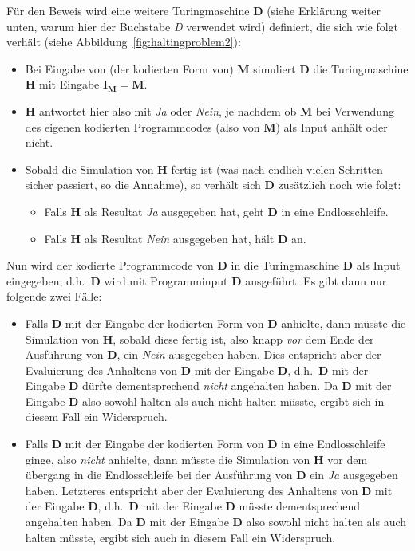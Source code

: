 Für den Beweis wird eine weitere Turingmaschine $\mathbf{D}$ (siehe Erklärung weiter unten, warum hier der Buchstabe \emph{D} verwendet wird) definiert, die sich wie folgt verhält (siehe Abbildung~\ref{fig:haltingproblem2}):
\begin{itemize}
  \item Bei Eingabe von (der kodierten Form von) $\mathbf{M}$ simuliert $\mathbf{D}$  die Turingmaschine $\mathbf{H}$ mit Eingabe $\mathbf{I_M = M}$.
  \item $\mathbf{H}$ antwortet hier also mit \emph{Ja} oder \emph{Nein}, je nachdem ob $\mathbf{M}$ bei Verwendung des eigenen kodierten Programmcodes (also von $\mathbf{M}$) als Input anhält oder nicht.
  \item Sobald die Simulation von $\mathbf{H}$ fertig ist (was nach endlich vielen Schritten sicher passiert, so die Annahme), so verhält sich $\mathbf{D}$ zusätzlich noch wie folgt:
    \begin{itemize}
      \item Falls $\mathbf{H}$ als Resultat \emph{Ja} ausgegeben hat, geht $\mathbf{D}$ in eine Endlosschleife.
      \item Falls $\mathbf{H}$ als Resultat \emph{Nein} ausgegeben hat, hält $\mathbf{D}$  an.
    \end{itemize}
\end{itemize}

\noindent Nun wird der kodierte Programmcode von $\mathbf{D}$ in die Turingmaschine $\mathbf{D}$ als Input eingegeben, d.h.\ $\mathbf{D}$ wird mit Programminput $\mathbf{D}$ ausgeführt. Es gibt dann nur folgende zwei Fälle:

\begin{itemize}
  \item Falls $\mathbf{D}$ mit der Eingabe der kodierten Form von $\mathbf{D}$ anhielte, dann müsste die Simulation von $\mathbf{H}$, sobald diese fertig ist, also knapp \emph{vor} dem Ende der Ausführung von $\mathbf{D}$, ein \emph{Nein} ausgegeben haben. Dies entspricht aber der Evaluierung des Anhaltens von $\mathbf{D}$ mit der Eingabe $\mathbf{D}$, d.h.\ $\mathbf{D}$ mit der Eingabe $\mathbf{D}$ dürfte dementsprechend \emph{nicht} angehalten haben. Da $\mathbf{D}$ mit der Eingabe $\mathbf{D}$ also sowohl halten als auch nicht halten müsste, ergibt sich in diesem Fall ein Widerspruch.
  \item Falls $\mathbf{D}$ mit der Eingabe der kodierten Form von $\mathbf{D}$ in eine Endlosschleife ginge, also \emph{nicht} anhielte, dann müsste die Simulation von $\mathbf{H}$ vor dem übergang in die Endlos\-schleife bei der Ausführung von $\mathbf{D}$ ein \emph{Ja} ausgegeben haben. Letzteres entspricht aber der Evaluierung des Anhaltens von $\mathbf{D}$ mit der Eingabe $\mathbf{D}$, d.h.\ $\mathbf{D}$ mit der Eingabe $\mathbf{D}$ müsste dementsprechend angehalten haben. Da $\mathbf{D}$ mit der Eingabe $\mathbf{D}$ also sowohl nicht halten als auch halten müsste, ergibt sich auch in diesem Fall ein Widerspruch.
\end{itemize}

